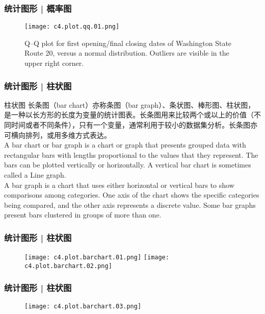 \begin{frame}
  \frametitle{统计图形 | 概率图}
  \begin{figure}
    \centering
    \texttt{[image: c4.plot.qq.01.png]}
    \caption{Q–Q plot for first opening/final closing dates of Washington State Route 20, versus a normal distribution. Outliers are visible in the upper right corner.}
  \end{figure}
\end{frame}

\begin{frame}
  \frametitle{统计图形 | 柱状图}
  \begin{block}{柱状图}
    长条图（bar chart）亦称条图（bar graph）、条状图、棒形图、柱状图，是一种以长方形的长度为变量的统计图表。长条图用来比较两个或以上的价值（不同时间或者不同条件），只有一个变量，通常利用于较小的数据集分析。长条图亦可横向排列，或用多维方式表达。\\
\vspace{0.5em}
A bar chart or bar graph is a chart or graph that presents grouped data with rectangular bars with lengths proportional to the values that they represent. The bars can be plotted vertically or horizontally. A vertical bar chart is sometimes called a Line graph.\\
\vspace{0.5em}
A bar graph is a chart that uses either horizontal or vertical bars to show comparisons among categories. One axis of the chart shows the specific categories being compared, and the other axis represents a discrete value. Some bar graphs present bars clustered in groups of more than one.
  \end{block}
\end{frame}

\begin{frame}
  \frametitle{统计图形 | 柱状图}
  \begin{figure}
    \centering
    \texttt{[image: c4.plot.barchart.01.png]}
    \texttt{[image: c4.plot.barchart.02.png]}
  \end{figure}
\end{frame}

\begin{frame}
  \frametitle{统计图形 | 柱状图}
  \begin{figure}
    \centering
    \texttt{[image: c4.plot.barchart.03.png]}
  \end{figure}
\end{frame}

